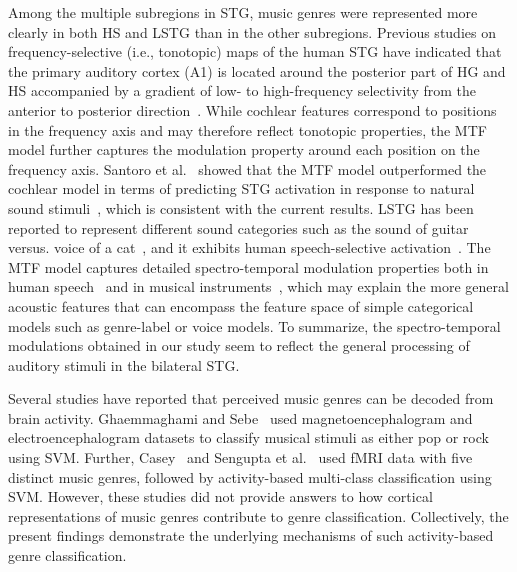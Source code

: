 \documentclass[journal]{IEEEtran}
\begin{document}
Among the multiple subregions in STG, music genres were represented more clearly in both HS and LSTG than in the other subregions.
Previous studies on frequency-selective (i.e., tonotopic) maps of the human STG have indicated that the primary auditory cortex (A1) is located around the posterior part of HG and HS accompanied by a gradient of low- to high-frequency selectivity from the anterior to posterior direction~\cite{ahveninen2016intracortical,leaver2016functional}.
While cochlear features correspond to positions in the frequency axis and may therefore reflect tonotopic properties, the MTF model further captures the modulation property around each position on the frequency axis.
Santoro et al.~\cite{santoro2014encoding} showed that the MTF model outperformed the cochlear model in terms of predicting STG activation in response to natural sound stimuli~\cite{santoro2014encoding}, which is consistent with the current results.
LSTG has been reported to represent different sound categories such as the sound of guitar versus. voice of a cat~\cite{staeren2009sound}, and it exhibits human speech-selective activation~\cite{norman2015distinct}.
The MTF model captures detailed spectro-temporal modulation properties both in human speech~\cite{elliott2009the} and in musical instruments~\cite{patil2012music}, which may explain the more general acoustic features that can encompass the feature space of simple categorical models such as genre-label or voice models.
To summarize, the spectro-temporal modulations obtained in our study seem to reflect the general processing of auditory stimuli in the bilateral STG.

Several studies have reported that perceived music genres can be decoded from brain activity.
Ghaemmaghami and Sebe~\cite{ghaemmaghami2016brain} used magnetoencephalogram and electroencephalogram datasets to classify musical stimuli as either pop or rock using SVM.
Further, Casey~\cite{casey2017music} and Sengupta et al.~\cite{sengupta2018spatial} used fMRI data with five distinct music genres, followed by activity-based multi-class classification using SVM.
However, these studies did not provide answers to how cortical representations of music genres contribute to genre classification.
Collectively, the present findings demonstrate the underlying mechanisms of such activity-based genre classification.
\end{document}
